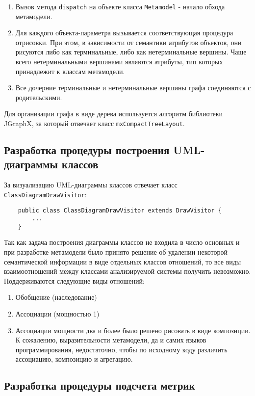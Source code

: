 \begin{enumerate}
    \item Вызов метода \texttt{dispatch} на объекте класса \texttt{Metamodel} -
    начало обхода метамодели.
    \item Для каждого объекта-параметра вызывается соответствующая процедура
    отрисовки. При этом, в зависимости от семантики атрибутов объектов, они
    рисуются либо как терминальные, либо как нетерминальные вершины. Чаще всего
    нетерминальными вершинами являются атрибуты, тип которых принадлежит к
    классам метамодели.
    \item Все дочерние терминальные и нетерминальные вершины графа соединяются с
    родительскими.
\end{enumerate}

Для организации графа в виде дерева используется алгоритм библиотеки JGraphX, за
который отвечает класс \texttt{mxCompactTreeLayout}.

\subsection{Разработка процедуры построения UML-диаграммы классов}

За визуализацию UML-диаграммы классов отвечает класс
\texttt{ClassDiagramDrawVisitor}:

\begin{lstlisting}
    public class ClassDiagramDrawVisitor extends DrawVisitor {
        ...
    }
\end{lstlisting}

Так как задача построения диаграммы классов не входила в число основных и при
разработке метамодели было принято решение об удалении некоторой семантической
информации в виде отдельных классов отношений, то все виды взаимоотношений между
классами анализируемой системы получить невозможно. Поддерживаются следующие
виды отношений:

\begin{enumerate}
    \item Обобщение (наследование)
    \item Ассоциации (мощностью 1)
    \item Ассоциации мощности два и более было решено рисовать в виде
    композиции. К сожалению, выразительности метамодели, да и самих языков
    программирования, недостаточно, чтобы по исходному коду различить
    ассоциацию, композицию и агрегацию.
\end{enumerate}

\subsection{Разработка процедуры подсчета метрик}

